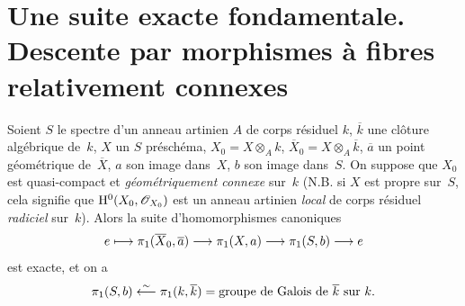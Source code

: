 \section[Une suite exacte fondamentale]{Une suite exacte fondamentale. Descente par morphismes \`a
fibres relativement connexes}
\label{IX.6}

\begin{theoreme}
\label{IX.6.1}
Soient $S$ le spectre d'un anneau artinien $A$ de corps r\'esiduel
$k$, $\overline{k}$ une cl\^oture alg\'ebrique de~$k$, $X$ un $S$
pr\'esch\'ema, $X_0=X\otimes_A k$, $\overline{X}_0=X\otimes_A
\overline{k}$, $\overline{a}$ un point g\'eom\'etrique
de~$\overline{X}$, $a$ son image dans~$X$, $b$ son image dans~$S$. On
suppose que $X_0$ est quasi-compact et \emph{géométriquement
connexe} sur~$k$ (N.B. si $X$ est propre sur~$S$, cela signifie que
$\H^0(X_0,\cal{O}_{X_0})$ est un anneau artinien \emph{local} de corps
r\'esiduel \emph{radiciel} sur~$k$). Alors la suite d'homomorphismes
canoniques
$$
e\mto \pi_1(\overline{X}_0,\overline{a})\to
\pi_1(X,a)\to\pi_1(S,b)\to e
$$
est exacte, et on a
$$
\pi_1(S,b)\overset{\sim}{\longleftarrow} \pi_1(k,\overline{k})=\text{groupe de Galois
de~$\overline{k}$ sur~$k$.}
$$
\end{theoreme}

